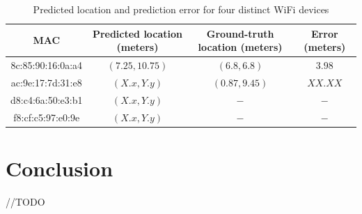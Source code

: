 \documentclass{article}
\begin{document}
\begin{center}
\begin{table}[h]
\centering
\begin{tabular}{ |c|c|c|c| }
 \hline
 MAC & Predicted location (meters) & Ground-truth location (meters) & Error (meters) \\
 \hline
 8c:85:90:16:0a:a4 & $(7.25, 10.75)$ & $(6.8, 6.8)$ & $3.98$\\
 ac:9e:17:7d:31:e8 & $(X.x, Y.y)$ & $(0.87, 9.45)$ & $XX.XX$ \\
 d8:c4:6a:50:e3:b1 & $(X.x, Y.y)$ & $-$ & $-$ \\
 f8:cf:c5:97:e0:9e & $(X.x, Y.y)$ & $-$ & $-$ \\
 \hline
\end{tabular}
 \caption{Predicted location and prediction error for four distinct WiFi devices \label{tab:results}}
\end{table}
\end{center}




\section{Conclusion}
\vspace{-.3cm}
//TODO


{\scriptsize%

}
\end{document}
